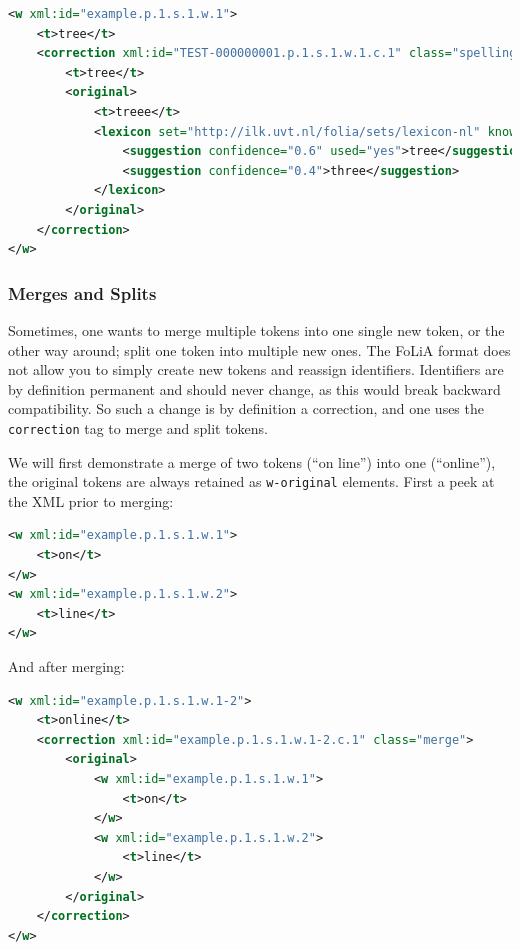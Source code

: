 \documentclass[a4paper,12pt]{report}
\begin{document}
\begin{lstlisting}[language=xml]
<w xml:id="example.p.1.s.1.w.1">
    <t>tree</t>
    <correction xml:id="TEST-000000001.p.1.s.1.w.1.c.1" class="spelling">
        <t>tree</t>
        <original>
            <t>treee</t>
            <lexicon set="http://ilk.uvt.nl/folia/sets/lexicon-nl" known="no">
                <suggestion confidence="0.6" used="yes">tree</suggestion>
                <suggestion confidence="0.4">three</suggestion>
            </lexicon>    
        </original>        
    </correction>
</w>
\end{lstlisting}



\subsubsection{Merges and Splits} 

Sometimes, one wants to merge multiple tokens into one single new token, or the other way around; split one token into multiple new ones. The FoLiA format does not allow you to simply create new tokens and reassign identifiers. Identifiers are by definition permanent and should never change, as this would break backward compatibility. So such a change is by definition a correction, and one uses the \texttt{correction} tag to merge and split tokens.

We will first demonstrate a merge of two tokens (``on line'') into one (``online''), the original tokens are always retained as \texttt{w-original} elements. First a peek at the XML prior to merging:

\begin{lstlisting}[language=xml]
<w xml:id="example.p.1.s.1.w.1">
    <t>on</t>
</w>
<w xml:id="example.p.1.s.1.w.2">
    <t>line</t>
</w>                         
\end{lstlisting}

And after merging:

\begin{lstlisting}[language=xml]
<w xml:id="example.p.1.s.1.w.1-2">
    <t>online</t>
    <correction xml:id="example.p.1.s.1.w.1-2.c.1" class="merge">
        <original>
            <w xml:id="example.p.1.s.1.w.1">
                <t>on</t>
            </w>
            <w xml:id="example.p.1.s.1.w.2">
                <t>line</t>
            </w>                         
        </original>
    </correction>       
</w>        
\end{lstlisting} 
\end{document}
